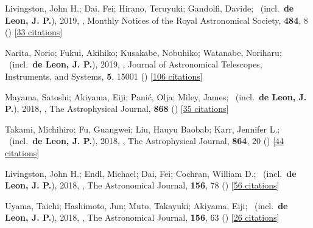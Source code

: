 \item[{\color{numcolor}\scriptsize9}] Livingston, John H.; Dai, Fei; Hirano, Teruyuki; Gandolfi, Davide; \etal\ (incl.\ \textbf{de Leon, J. P.}), 2019, , Monthly Notices of the Royal Astronomical Society, \textbf{484}, 8 () [\href{https://ui.adsabs.harvard.edu/abs/2019MNRAS.484....8L}{33 citations}]

\item[{\color{numcolor}\scriptsize8}] Narita, Norio; Fukui, Akihiko; Kusakabe, Nobuhiko; Watanabe, Noriharu; \etal\ (incl.\ \textbf{de Leon, J. P.}), 2019, , Journal of Astronomical Telescopes, Instruments, and Systems, \textbf{5}, 15001 () [\href{https://ui.adsabs.harvard.edu/abs/2019JATIS...5a5001N}{106 citations}]

\item[{\color{numcolor}\scriptsize7}] Mayama, Satoshi; Akiyama, Eiji; Pani{\'c}, Olja; Miley, James; \etal\ (incl.\ \textbf{de Leon, J. P.}), 2018, , The Astrophysical Journal, \textbf{868} () [\href{https://ui.adsabs.harvard.edu/abs/2018ApJ...868L...3M}{35 citations}]

\item[{\color{numcolor}\scriptsize6}] Takami, Michihiro; Fu, Guangwei; Liu, Hauyu Baobab; Karr, Jennifer L.; \etal\ (incl.\ \textbf{de Leon, J. P.}), 2018, , The Astrophysical Journal, \textbf{864}, 20 () [\href{https://ui.adsabs.harvard.edu/abs/2018ApJ...864...20T}{44 citations}]

\item[{\color{numcolor}\scriptsize5}] Livingston, John H.; Endl, Michael; Dai, Fei; Cochran, William D.; \etal\ (incl.\ \textbf{de Leon, J. P.}), 2018, , The Astronomical Journal, \textbf{156}, 78 () [\href{https://ui.adsabs.harvard.edu/abs/2018AJ....156...78L}{56 citations}]

\item[{\color{numcolor}\scriptsize4}] Uyama, Taichi; Hashimoto, Jun; Muto, Takayuki; Akiyama, Eiji; \etal\ (incl.\ \textbf{de Leon, J. P.}), 2018, , The Astronomical Journal, \textbf{156}, 63 () [\href{https://ui.adsabs.harvard.edu/abs/2018AJ....156...63U}{26 citations}]

